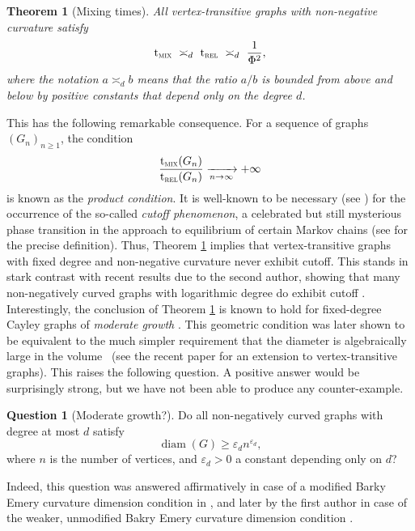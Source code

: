 \documentclass[JEP,XML,SOM,Unicode,NoEqCountersInSection,published]{cedram}
\newtheorem{theorem}{Theorem}
\theoremstyle{definition}
\newtheorem{question}{Question}
\newcommand{\trel}{\mathrm{t}_{\textup{\textsc{rel}}}}
\newcommand{\tmix}{\mathrm{t}_{\textup{\textsc{mix}}}}
\DeclareMathOperator{\diam}{diam}
\begin{document}
\begin{theorem}[Mixing times]\label{th:graphmix}All vertex-transitive graphs with non-negative curvature satisfy
\begin{equation*}
\tmix \ \asymp_d \ \trel \ \asymp_d \ \frac{1}{\Phi^2},
\end{equation*}
where the notation $a\asymp_d b$ means that the ratio $a/b$ is bounded from above and below by positive constants that depend only on the degree $d$.
\end{theorem}
This has the following remarkable consequence. For a sequence of graphs $(G_n)_{n\ge 1}$, the condition
\begin{equation*}
\frac{\tmix(G_n)}{\trel(G_n)} \xrightarrow[n\to\infty]{} +\infty
\end{equation*}
is known as the \emph{product condition}. It is well-known to be necessary (see \cite[Prop.\,18.4]{MR3726904}) for the occurrence of the so-called \emph{cutoff phenomenon}, a celebrated but still mysterious phase transition in the approach to equilibrium of certain Markov chains (see \cite[Chap.\,18]{MR3726904} for the precise definition). Thus, Theorem \ref{th:graphmix} implies that vertex-transitive graphs with fixed degree and non-negative curvature never exhibit cutoff. This stands in stark contrast with recent results due to the second author, showing that many non-negatively curved graphs with logarithmic degree do exhibit cutoff \cite{salez2021cutoff}. Interestingly, the conclusion of Theorem \ref{th:graphmix} is known to hold for fixed-degree Cayley graphs of \emph{moderate growth} \cite{MR1254308}. This geometric condition was later shown to be equivalent to the much simpler requirement that the diameter is algebraically large in the volume~\cite{MR3439705} (see the recent paper \cite{MR4253426} for an extension to vertex-transitive graphs). This raises the following question. A positive answer would be surprisingly strong, but we have not been able to produce any counter-example.
\begin{question}[Moderate growth?]Do all non-negatively curved graphs with degree at most $d$ satisfy
\begin{equation*}
\diam(G) \ge \varepsilon_d n^{\varepsilon_d},
\end{equation*}
where $n$ is the number of vertices, and $\varepsilon_d>0$ a constant depending only on $d$?
\end{question}

Indeed, this question was answered affirmatively in case of a modified Barky Emery curvature dimension condition in \cite{bauer2015li}, and later by the first author in case of the weaker, unmodified Bakry Emery curvature dimension condition \cite{munch2019li}.
\end{document}
